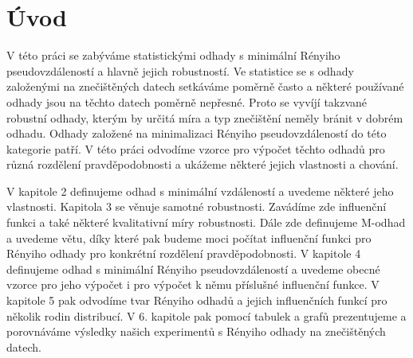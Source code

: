 \chapter{Úvod}
 V této práci se zabýváme statistickými odhady s minimální Rényiho pseudovzdáleností a hlavně jejich robustností. Ve statistice se s odhady založenými na znečištěných datech setkáváme poměrně často a některé používané odhady jsou na těchto datech poměrně nepřesné. Proto se vyvíjí takzvané robustní odhady, kterým by určitá míra a typ znečištění neměly bránit v dobrém odhadu. Odhady založené na minimalizaci Rényiho pseudovzdáleností do této kategorie patří. V této práci odvodíme vzorce pro výpočet těchto odhadů pro různá rozdělení pravděpodobnosti a ukážeme některé jejich vlastnosti a chování. 
 
V kapitole 2 definujeme odhad s minimální vzdáleností a uvedeme některé jeho vlastnosti. Kapitola 3 se věnuje samotné robustnosti. Zavádíme zde influenční funkci a také některé kvalitativní míry robustnosti. Dále zde definujeme M-odhad a uvedeme větu, díky které pak budeme moci počítat influenční funkci pro Rényiho odhady pro konkrétní rozdělení pravděpodobnosti. V kapitole 4 definujeme odhad s minimální Rényiho pseudovzdáleností a uvedeme obecné vzorce pro jeho výpočet i pro výpočet k němu příslušné influenční funkce. V kapitole 5 pak odvodíme tvar Rényiho odhadů a jejich influenčních funkcí pro několik rodin distribucí. V 6. kapitole pak pomocí tabulek a grafů prezentujeme a porovnáváme výsledky našich experimentů s Rényiho odhady na znečištěných datech.